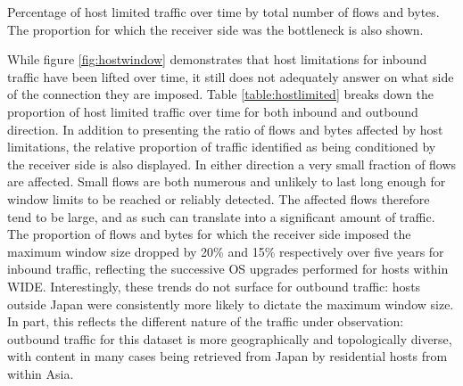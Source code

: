 \begin{table}\footnotesize
\centering
  \caption[Percentage of host limited traffic over time by total number of flows and bytes.]{\label{table:hostlimited}Percentage of host limited traffic over time by total number of flows and bytes. The proportion for which the receiver side was the bottleneck is also shown.}
\end{table}

While figure \ref{fig:hostwindow} demonstrates that host limitations for inbound traffic have been lifted over time, it still does not adequately answer on what side of the connection they are imposed.
Table \ref{table:hostlimited} breaks down the proportion of host limited traffic over time for both inbound and outbound direction.
In addition to presenting the ratio of flows and bytes affected by host limitations, the relative proportion of traffic identified as being conditioned by the receiver side is also displayed.
In either direction a very small fraction of flows are affected.
Small flows are both numerous and unlikely to last long enough for window limits to be reached or reliably detected.
The affected flows therefore tend to be large, and as such can translate into a significant amount of traffic.
The proportion of flows and bytes for which the receiver side imposed the maximum window size dropped by 20\% and 15\% respectively over five years for inbound traffic, reflecting the successive \acs{OS} upgrades performed for hosts within \acs{WIDE}.
Interestingly, these trends do not surface for outbound traffic: hosts outside Japan were consistently more likely to dictate the maximum window size.
In part, this reflects the different nature of the traffic under observation: outbound traffic for this dataset is more geographically and topologically diverse, with content in many cases being retrieved from Japan by residential hosts from within Asia.

